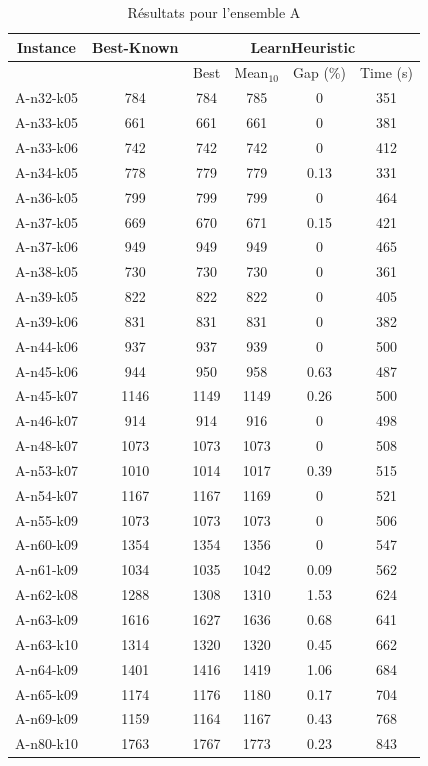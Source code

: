 \documentclass[a4paper,11pt]{article}%
\begin{document}
\begin{table}[p]
\caption{Résultats pour l'ensemble A}
\label{TA}
\begin{center}
\begin{tabular}{|@{}c@{}|@{}c@{}|@{}c@{}|@{}c@{}|@{}c@{}|@{}c@{}|}

\hline
 Instance & Best-Known & \multicolumn{4}{c|}{LearnHeuristic}  \\
 \hline
 & & Best & Mean$_{10}$ & Gap (\%) & Time (s) \\ 
 \hline
 A-n32-k05 & 784 & 784 & 785 & 0 & 351  \\
 \hline
 A-n33-k05   & 661 & 661 & 661 &0 & 381   \\
  \hline
   A-n33-k06 & 742 & 742 & 742 &0 & 412  \\
 \hline
   A-n34-k05 & 778 & 779 & 779 &0.13 & 331  \\
  \hline
   A-n36-k05 & 799 & 799 & 799 & 0 & 464  \\
 \hline
  A-n37-k05  & 669 & 670 & 671 & 0.15 & 421  \\
  \hline
  A-n37-k06 & 949 & 949 & 949 & 0 & 465 \\
 \hline
  A-n38-k05  & 730 & 730 & 730 & 0 & 361 \\
 \hline
 A-n39-k05 & 822 & 822 & 822 & 0 & 405 \\
 \hline
  A-n39-k06  & 831 & 831 & 831 & 0 & 382   \\
 \hline
   A-n44-k06 & 937 & 937 & 939 & 0 & 500   \\
  \hline
   A-n45-k06 & 944 & 950 & 958 & 0.63 & 487  \\
 \hline 
  A-n45-k07  & 1146 & 1149 & 1149 & 0.26 & 500 \\
  \hline
  A-n46-k07  & 914 & 914 & 916 &0 & 498  \\
  \hline
  A-n48-k07 & 1073 & 1073 & 1073 &0 & 508 \\
 \hline
  A-n53-k07  & 1010 & 1014 & 1017 &0.39 & 515   \\
  \hline
  A-n54-k07  & 1167 & 1167 & 1169 & 0 & 521  \\
  \hline
  A-n55-k09 & 1073 & 1073 & 1073 &0 & 506  \\
 \hline 
   A-n60-k09 & 1354 & 1354 & 1356 &0 & 547  \\
  \hline 
  A-n61-k09  & 1034 & 1035 & 1042 &0.09 & 562  \\
  \hline
    A-n62-k08  & 1288 & 1308  & 1310 &1.53 & 624   \\
  \hline
    A-n63-k09  & 1616 & 1627 & 1636 &0.68 & 641   \\
  \hline
    A-n63-k10  & 1314 & 1320 &1320 &0.45 & 662   \\
  \hline
    A-n64-k09  & 1401 & 1416 & 1419 &1.06 & 684   \\
  \hline
    A-n65-k09  & 1174 & 1176 & 1180 &0.17 & 704   \\
  \hline
    A-n69-k09  & 1159 & 1164 & 1167 & 0.43 & 768   \\
  \hline
    A-n80-k10  & 1763 & 1767 & 1773 & 0.23 & 843   \\
  \hline
\end{tabular}
\end{center}
\end{table}
\end{document}
